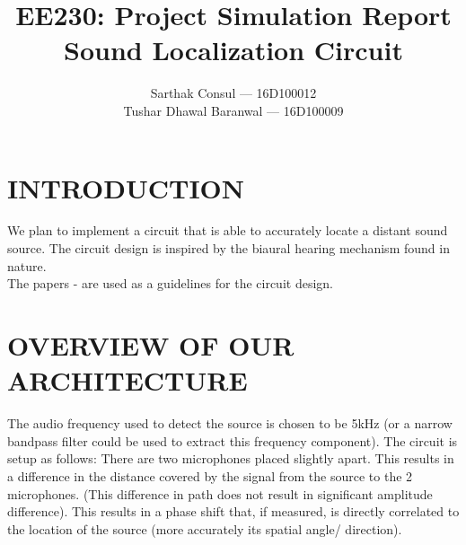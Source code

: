 \documentclass[10pt, conference]{IEEEtran}
\title{EE230: Project Simulation Report\\
Sound Localization Circuit}
\author{Sarthak Consul --- 16D100012\\
        Tushar Dhawal Baranwal --- 16D100009}
\begin{document}
\IEEEoverridecommandlockouts
\IEEEpubid{\makebox[\columnwidth]{}
\hspace{\columnsep}\makebox[\columnwidth]{ }}

\maketitle


\section{INTRODUCTION}
We plan to implement a circuit that is able to accurately locate a distant sound source. The circuit design is inspired by the biaural hearing mechanism found in nature.\\
The papers \cite{1031521} - \cite{541607} are used as a guidelines for the circuit design.


\section{OVERVIEW OF OUR ARCHITECTURE}
The audio frequency used to detect the source is chosen to be 5kHz (or a narrow bandpass filter could be used to extract this frequency component). The circuit is setup as follows: There are two microphones placed slightly apart. This results in a difference in the distance covered by the signal from the source to the 2 microphones. (This difference in path does not result in significant amplitude difference). This results in a phase shift that, if measured, is directly correlated to the location of the source (more accurately its spatial angle/ direction).
\end{document}
